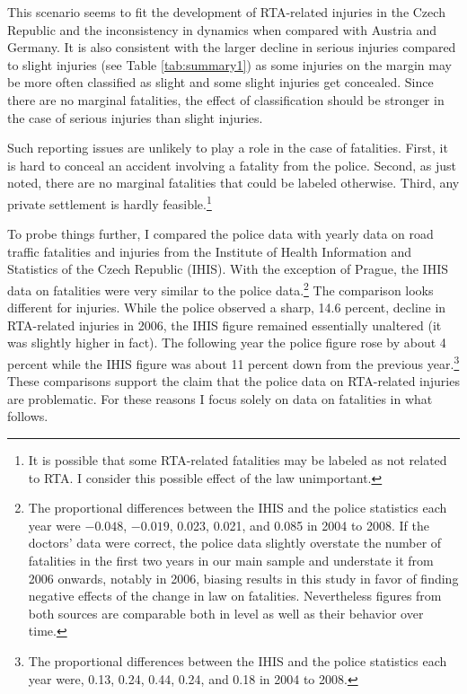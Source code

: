 \documentclass[12pt]{article}
\begin{document}
This scenario seems to fit the development of RTA-related injuries in the Czech
Republic and the inconsistency in dynamics when compared with Austria and
Germany.  It is also consistent with the larger decline in serious injuries
compared to slight injuries (see Table \ref{tab:summary1}) as some injuries on
the margin may be more often classified as slight and some slight injuries get
concealed. Since there are no marginal fatalities, the effect of classification
should be stronger in the case of serious injuries than slight injuries.

Such reporting issues are unlikely to play a role in the case of fatalities.
First, it is hard to conceal an accident involving a fatality from the police.
Second, as just noted, there are no marginal fatalities that could be labeled
otherwise.  Third, any private settlement is hardly feasible.\footnote{It is
  possible that some RTA-related fatalities may be labeled as not related to
  RTA. I consider this possible effect of the law unimportant.} 
                            
To probe things further, I compared the police data with yearly data on road
traffic fatalities and injuries from the  Institute of Health Information and
Statistics of the Czech Republic (IHIS). With the exception of Prague, the IHIS
data on fatalities were very similar to the police
data.\footnote{\label{fn:uzis-data}The proportional differences between the IHIS
  and the police statistics each year were  $-0.048$, $-0.019$, 0.023, 0.021,
  and 0.085 in 2004 to 2008.  If the doctors' data were correct, the police data
  slightly overstate the number of fatalities in the first two years in our main
  sample and understate it from 2006 onwards, notably in 2006, biasing results
  in this study in favor of finding negative effects of the change in law on
  fatalities.  Nevertheless figures from both sources are comparable both in
  level as well as their behavior over time.} The comparison looks different for
injuries. While the police observed a sharp, 14.6 percent, decline in
RTA-related injuries in 2006, the IHIS figure remained essentially unaltered (it
was slightly higher in fact).  The following year the police figure rose by
about 4 percent while the IHIS figure was about 11 percent down from the
previous year.\footnote{The proportional differences between the IHIS and the
  police statistics each year were, 0.13, 0.24, 0.44, 0.24, and 0.18 in 2004 to
  2008.} These comparisons support the claim that the police data on RTA-related
injuries are problematic. For these reasons I focus solely on data on fatalities
in what follows.       
\end{document}
